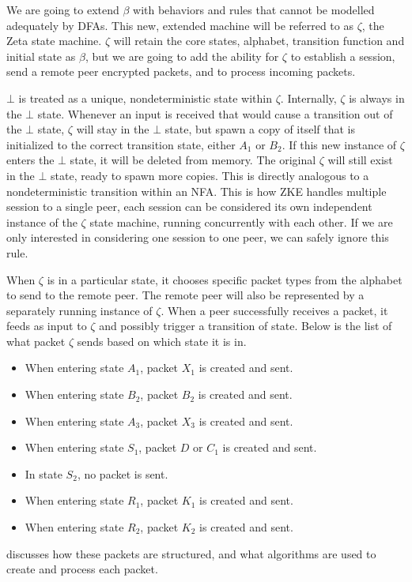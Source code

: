 \documentclass{article}
\begin{document}
\begin{definition}\label{def:state_machine}
	We are going to extend $\beta$ with behaviors and rules that cannot be modelled adequately by DFAs. This new, extended machine will be referred to as $\zeta$, the Zeta state machine. $\zeta$ will retain the core states, alphabet, transition function and initial state as $\beta$, but we are going to add the ability for $\zeta$ to establish a session, send a remote peer encrypted packets, and to process incoming packets.

	$\bot$ is treated as a unique, nondeterministic state within $\zeta$. Internally, $\zeta$ is always in the $\bot$ state. Whenever an input is received that would cause a transition out of the $\bot$ state, $\zeta$ will stay in the $\bot$ state, but spawn a copy of itself that is initialized to the correct transition state, either $A_1$ or $B_2$. If this new instance of $\zeta$ enters the $\bot$ state, it will be deleted from memory. The original  $\zeta$ will still exist in the $\bot$ state, ready to spawn more copies. This is directly analogous to a nondeterministic transition within an NFA. This is how ZKE handles multiple session to a single peer, each session can be considered its own independent instance of the $\zeta$ state machine, running concurrently with each other. If we are only interested in considering one session to one peer, we can safely ignore this rule.

	When $\zeta$ is in a particular state, it chooses specific packet types from the alphabet to send to the remote peer. The remote peer will also be represented by a separately running instance of $\zeta$. When a peer successfully receives a packet, it feeds as input to $\zeta$ and possibly trigger a transition of state. Below is the list of what packet $\zeta$ sends based on which state it is in.
	\begin{itemize}
		\item When entering state $A_1$, packet $X_1$ is created and sent.
		\item When entering state $B_2$, packet $B_2$ is created and sent.
		\item When entering state $A_3$, packet $X_3$ is created and sent.
		\item When entering state $S_1$, packet $D$ or $C_1$ is created and sent.
		\item In state $S_2$, no packet is sent.
		\item When entering state $R_1$, packet $K_1$ is created and sent.
		\item When entering state $R_2$, packet $K_2$ is created and sent.
	\end{itemize}
	 discusses how these packets are structured, and what algorithms are used to create and process each packet.


\end{definition}
\end{document}
